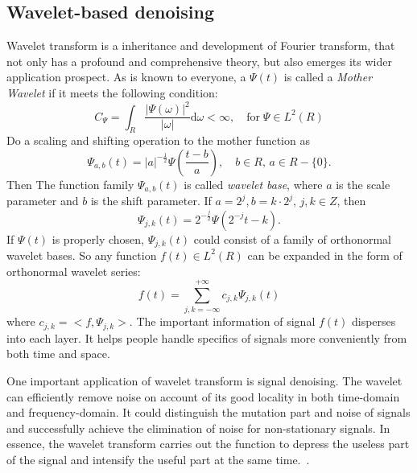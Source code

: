 \subsection{Wavelet-based denoising}
Wavelet transform is a inheritance and development of Fourier
transform, that not only has a profound and comprehensive theory, 
but also emerges its wider application prospect. As is known to
everyone, a $\Psi(t)$ is called a \emph{Mother Wavelet} if it meets
the following condition: 
\begin{equation}
    C_\Psi=\int_R \frac{|\Psi(\omega)|^2}{|\omega|}\mathrm{d}\omega <
    \infty, \quad \mathrm{for} \; \Psi \in L^2(R)
    \label{waveletdefinition}
\end{equation}
Do a scaling and shifting operation to the mother function as 
\begin{equation}
    \Psi_{a,b}(t) = |a|^{-\frac{1}{2}}\Psi(\frac{t-b}{a}), \quad b \in
    R, \, a \in R - \{0\}.
    \label{waveletbase}
\end{equation}
Then The function family ${\Psi_{a,b}(t)}$ is called \emph{wavelet base},
where $a$ is the scale parameter and $b$ is the shift parameter. If
$a=2^j,b=k\cdot 2^j,\,j,k \in Z$, then
\begin{equation}
    \Psi_{j,k}(t)=2^{-\frac{j}{2}}\Psi(2^{-j}t-k).
    \label{wavelet3}
\end{equation}
If $\Psi(t)$ is properly chosen, ${\Psi_{j,k}(t)}$ could consist of a
family of orthonormal wavelet bases. So any function $f(t)\in L^2(R)$ can
be expanded in the form of orthonormal wavelet series:
\begin{equation}
    f(t)=\sum_{j,k=-\infty}^{+\infty} c_{j,k}\Psi_{j,k}(t)
    \label{waveletdecomp}
\end{equation}
where $c_{j,k}=<f,\Psi_{j,k}>$. The important information of signal
$f(t)$ disperses into each layer. It helps people handle specifics of
signals more conveniently from both time and space. 

One important application of wavelet transform is signal denoising.
The wavelet can efficiently remove noise on account of its good 
locality in both time-domain and frequency-domain. It could 
distinguish the mutation part and noise of signals and successfully
achieve the elimination of noise for non-stationary signals. In
essence, the wavelet transform carries out the function to depress the
useless part of the signal and intensify the useful part at the same
time.~\cite{debnath2002wavelet, Changfa2001, Qiwen2001}. 


